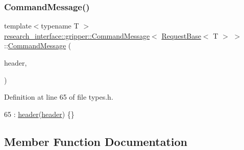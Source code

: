 \subsubsection{\texorpdfstring{Command\+Message()}{CommandMessage()}\hspace{0.1cm}{\footnotesize\ttfamily [2/2]}}
{\footnotesize\ttfamily template$<$typename T $>$ \\
\hyperlink{structresearch__interface_1_1gripper_1_1CommandMessage}{research\+\_\+interface\+::gripper\+::\+Command\+Message}$<$ \hyperlink{structresearch__interface_1_1gripper_1_1RequestBase}{Request\+Base}$<$ T $>$ $>$\+::\hyperlink{structresearch__interface_1_1gripper_1_1CommandMessage}{Command\+Message} (\begin{DoxyParamCaption}\item[{const \hyperlink{structresearch__interface_1_1gripper_1_1CommandHeader}{Command\+Header} \&}]{header,  }\item[{const \hyperlink{structresearch__interface_1_1gripper_1_1RequestBase}{Request\+Base}$<$ T $>$ \&}]{ }\end{DoxyParamCaption})\hspace{0.3cm}{\ttfamily [inline]}}



Definition at line 65 of file types.\+h.


\begin{DoxyCode}
65 : \hyperlink{structresearch__interface_1_1gripper_1_1CommandMessage_3_01RequestBase_3_01T_01_4_01_4_a3ac3bc01bbe1e063fb3f8dae485f18e2}{header}(\hyperlink{structresearch__interface_1_1gripper_1_1CommandMessage_3_01RequestBase_3_01T_01_4_01_4_a3ac3bc01bbe1e063fb3f8dae485f18e2}{header}) \{\}
\end{DoxyCode}


\subsection{Member Function Documentation}
\mbox{\label{structresearch__interface_1_1gripper_1_1CommandMessage_3_01RequestBase_3_01T_01_4_01_4_a8577469e81c7396ff94fa745e893d204}} 
